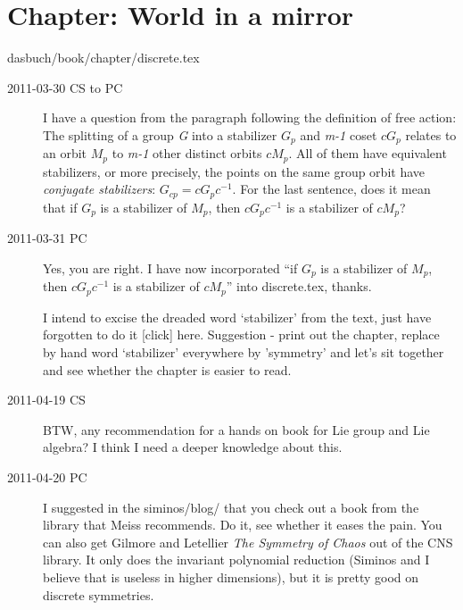 \section{Chapter: World in a mirror}
\label{c-discrete}\noindent dasbuch/book/chapter/discrete.tex
\begin{description}

\item[2011-03-30  CS to PC]
I have a question from the paragraph
following the definition of free action: The splitting of a group
\emph{G} into a stabilizer \emph{$G_{p}$} and \emph{m-1} coset
\emph{$cG_{p}$} relates to an orbit \emph{$M_{p}$} to \emph{m-1} other
distinct orbits \emph{$cM_{p}$}. All of them have equivalent stabilizers,
or more precisely, the points on the same group orbit have
\emph{conjugate stabilizers}: \emph{$G_{cp} = cG_{p}c^{-1}$}. For the
last sentence, does it mean that if \emph{$G_{p}$}  is a stabilizer of
\emph{$M_{p}$}, then \emph{$cG_{p}c^{-1}$} is a stabilizer of
\emph{$cM_{p}$}?

\item[2011-03-31 PC] Yes, you are right. I have now incorporated ``if
\emph{$G_{p}$}  is a stabilizer of \emph{$M_{p}$}, then
\emph{$cG_{p}c^{-1}$} is a stabilizer of \emph{$cM_{p}$}'' into
discrete.tex, thanks.

I intend to excise the dreaded word `stabilizer' from the text, just have
forgotten to do it
{[click]} here. Suggestion - print out the chapter, replace by hand word
`stabilizer' everywhere by 'symmetry' and let's sit together and see
whether the chapter is  easier to read.

\item[2011-04-19 CS]
BTW, any recommendation for a hands on book for Lie group and Lie
algebra? I think I need a deeper knowledge about this.

\item[2011-04-20 PC] I suggested in the siminos/blog/
that you check out a book from the library that Meiss recommends. Do it, see
whether it eases the pain. You can also get
Gilmore and Letellier
{\em The Symmetry of Chaos} out of the CNS library. It only does the
invariant polynomial reduction (Siminos and I believe that is useless in
higher dimensions), but it is pretty good on discrete symmetries.

\end{description}


